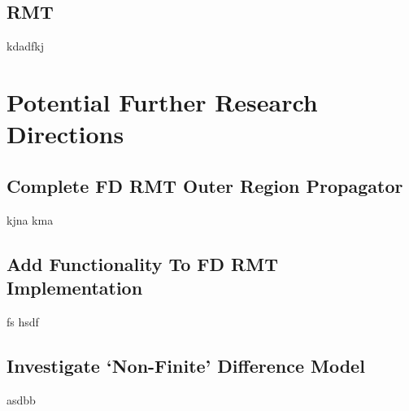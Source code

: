 \subsection{RMT}
kdadfkj

\section{Potential Further Research Directions}

\subsection{Complete FD RMT Outer Region Propagator}
kjna kma

\subsection{Add Functionality To FD RMT Implementation}
fs hsdf 

\subsection{Investigate `Non-Finite' Difference Model}
asdbb

